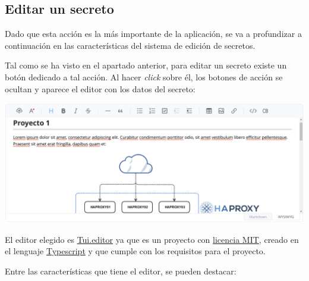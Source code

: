 \documentclass{\ClassPath/viu-tfm-template}
\begin{document}
\subsection{Editar un secreto}

Dado que esta acción es la más importante de la aplicación, se va a profundizar a continuación en las características del sistema de edición de secretos.

Tal como se ha visto en el apartado anterior, para editar un secreto existe un botón dedicado a tal acción. Al hacer \textit{click} sobre él, los botones de acción se ocultan y aparece el editor con los datos del secreto:

\begin{center}
    \includegraphics[width=\linewidth]{img/editor.png}
\end{center}

El editor elegido es \href{https://github.com/nhn/tui.editor}{Tui.editor} ya que es un proyecto con \href{https://es.wikipedia.org/wiki/Licencia_MIT}{licencia MIT}, creado en el lenguaje \href{https://es.wikipedia.org/wiki/TypeScript}{Typescript} y que cumple con los requisitos para el proyecto.

Entre las características que tiene el editor, se pueden destacar:
\end{document}
